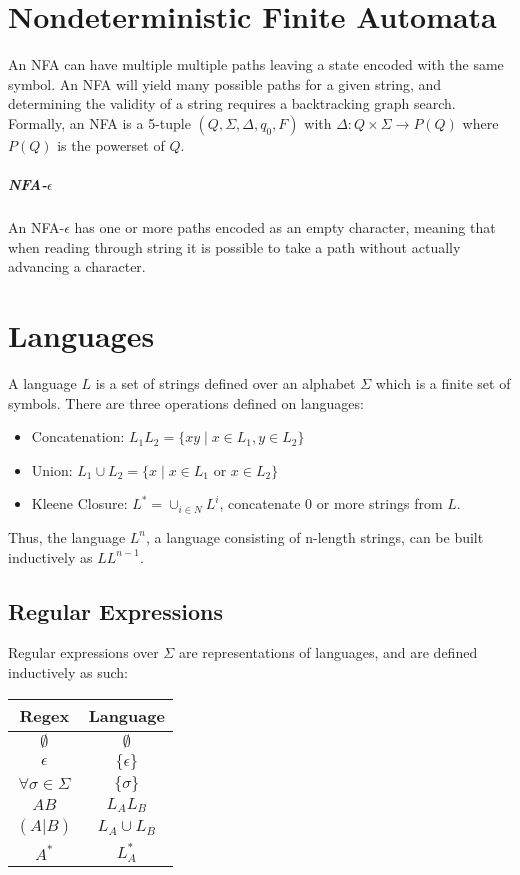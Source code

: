 \documentclass[11pt]{article}
\begin{document}
\section{Nondeterministic Finite Automata}
	An NFA can have multiple multiple paths leaving a state encoded with the same symbol. An NFA will yield many possible paths for a given string, and determining the validity of a string requires a backtracking graph search. Formally, an NFA is a 5-tuple $(Q, \Sigma, \Delta, q_0, F)$ with $\Delta : Q \times \Sigma \rightarrow P(Q)$ where $P(Q)$ is the powerset of $Q$.
	
	\subparagraph{NFA-$\epsilon$} An NFA-$\epsilon$ has one or more paths encoded as an empty character, meaning that when reading through string it is possible to take a path without actually advancing a character.
	
\section{Languages}
	A language $L$ is a set of strings defined over an alphabet $\Sigma$ which is a finite set of symbols. There are three operations defined on languages:
	\begin{itemize}
		\item Concatenation: $L_1L_2 = \{xy \mid x \in L_1,  y \in L_2\}$
		\item Union: $L_1 \cup  L_2 = \{x \mid x \in L_1 \text{ or } x \in L_2\}$
		\item Kleene Closure: $L^* = \cup_{i\in N} L^i$, concatenate 0 or more strings from $L$.
	\end{itemize}
	Thus, the language $L^n$, a language consisting of n-length strings, can be built inductively as $LL^{n-1}$.
	
	\subsection{Regular Expressions}
		Regular expressions over $\Sigma$ are representations of languages, and are defined inductively as such:
		\begin{center}
		\begin{tabular}{c|c}
			Regex & Language\\\hline
			$\emptyset$ & $\emptyset$\\
			$\epsilon$ & $\{\epsilon\}$\\
			$\forall \sigma \in \Sigma$ & $\{\sigma\}$\\
			$AB$ & $L_AL_B$\\
			$(A|B)$ & $L_A \cup L_B$\\
			$A^*$ & $L_A^*$
		\end{tabular}
		\end{center}
	
\end{document}
